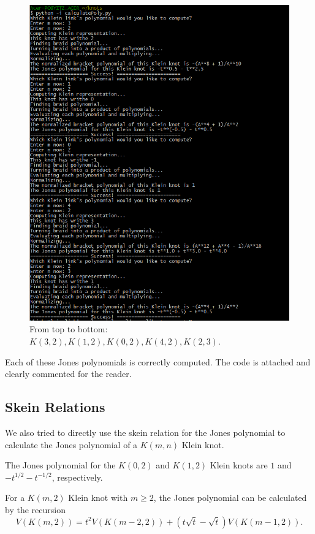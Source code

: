 \documentclass[12pt]{article}
\newenvironment{theorem}[2][Theorem]{\begin{trivlist}
\item[\hskip \labelsep {\bfseries #1}\hskip \labelsep {\bfseries #2.}]}{\end{trivlist}}
\begin{document}
\begin{figure}[H]
\centering
\includegraphics[width=6.5in]{kleincode}
\caption{\label{code} From top to bottom: $K(3, 2), K(1, 2), K(0, 2), K(4, 2), K(2, 3).$}
\end{figure}

Each of these Jones polynomials is correctly computed. The code is attached and clearly commented for the reader. 


\subsection{Skein Relations}

We also tried to directly use the skein relation for the Jones polynomial to calculate the Jones polynomial of a $K(m, n)$ Klein knot.

\begin{theorem}{3.4}

The Jones polynomial for the $K(0, 2)$ and $K(1, 2)$ Klein knots are $1$ and $-t^{1/2} - t^{-1/2}$, respectively. 

For a $K(m, 2)$ Klein knot with $m \geq 2$, the Jones polynomial can be calculated by the recursion  $$V(K(m, 2)) = t^2 V(K(m - 2, 2)) + (t \sqrt{t} - \sqrt{t}) V(K(m - 1, 2)).$$

\end{theorem}
\end{document}
